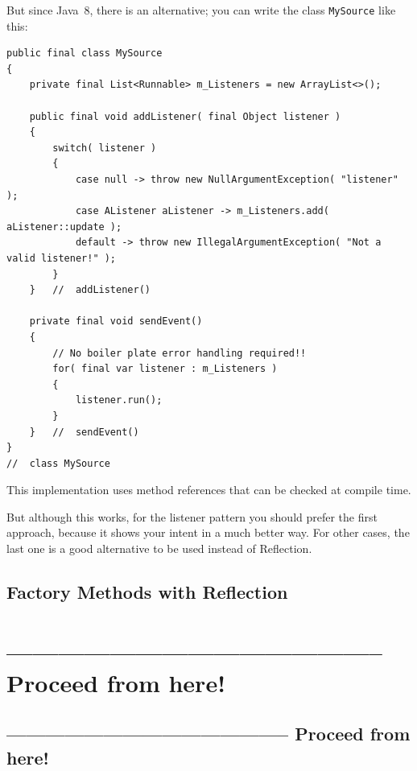 \documentclass[11pt,a4paper, titlepage, parskip=half, headsepline, footsepline, cleardoublepage=current, headheight=1cm]{scrbook}
\begin{document}
But since Java~8, there is an alternative; you can write the class \lstinline|MySource| like this:
\begin{lstlisting}
public final class MySource
{
    private final List<Runnable> m_Listeners = new ArrayList<>();
    
    public final void addListener( final Object listener )
    {
        switch( listener )
        {
            case null -> throw new NullArgumentException( "listener" );
            case AListener aListener -> m_Listeners.add( aListener::update );
            default -> throw new IllegalArgumentException( "Not a valid listener!" );
        }
    }   //  addListener()
    
    private final void sendEvent()
    {
        // No boiler plate error handling required!!
        for( final var listener : m_Listeners )
        {
            listener.run();
        }
    }   //  sendEvent()
}
//  class MySource
\end{lstlisting}
This implementation uses method references that can be checked at compile time.

But although this works, for the listener pattern you should prefer the first approach, because it shows your intent in a much better way. For other cases, the last one is a good alternative to be used instead of Reflection.


\subsection{Factory Methods with Reflection}


\section{-------------------------------------------- Proceed from here!}
\subsection{-------------------------------------------- Proceed from here!}
\end{document}

